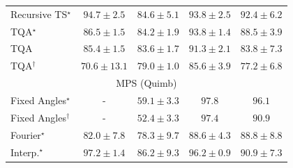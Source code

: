\begin{tabular}{l|cccc|}
Recursive TS$^\star$ & {\cellcolor[HTML]{6E096A}} \color[HTML]{F1F1F1} $94.7\pm 2.5$ & {\cellcolor[HTML]{8A51A5}} \color[HTML]{F1F1F1} $84.6\pm 5.1$ & {\cellcolor[HTML]{760C71}} \color[HTML]{F1F1F1} $93.8\pm 2.5$ & {\cellcolor[HTML]{81117D}} \color[HTML]{F1F1F1} $92.4\pm 6.2$ \\
TQA$^\star$ & {\cellcolor[HTML]{88449E}} \color[HTML]{F1F1F1} $86.5\pm 1.5$ & {\cellcolor[HTML]{8A55A7}} \color[HTML]{F1F1F1} $84.2\pm 1.9$ & {\cellcolor[HTML]{760C71}} \color[HTML]{F1F1F1} $93.8\pm 1.4$ & {\cellcolor[HTML]{863394}} \color[HTML]{F1F1F1} $88.5\pm 3.9$ \\
TQA & {\cellcolor[HTML]{894CA2}} \color[HTML]{F1F1F1} $85.4\pm 1.5$ & {\cellcolor[HTML]{8A59A8}} \color[HTML]{F1F1F1} $83.6\pm 1.7$ & {\cellcolor[HTML]{831A83}} \color[HTML]{F1F1F1} $91.3\pm 2.1$ & {\cellcolor[HTML]{8A58A8}} \color[HTML]{F1F1F1} $83.8\pm 7.3$ \\
TQA$^\dagger$ & {\cellcolor[HTML]{9BB6D7}} \color[HTML]{000000} $70.6\pm 13.1$ & {\cellcolor[HTML]{8C7AB8}} \color[HTML]{F1F1F1} $79.0\pm 1.0$ & {\cellcolor[HTML]{894BA2}} \color[HTML]{F1F1F1} $85.6\pm 3.9$ & {\cellcolor[HTML]{8C88BF}} \color[HTML]{F1F1F1} $77.2\pm 6.8$ \\
\cline{1-5}
\multicolumn{5}{c}{\rule{0pt}{8pt}MPS (Quimb)} \\
\midrule
Fixed Angles$^\star$ & {\cellcolor[HTML]{000000}} \color[HTML]{F1F1F1} {\cellcolor{white}} \color{black} - & {\cellcolor[HTML]{FFF4B5}} \color[HTML]{000000} $59.1\pm 3.3$ & {\cellcolor[HTML]{6B2606}} \color[HTML]{F1F1F1} $97.8$ & {\cellcolor[HTML]{792B05}} \color[HTML]{F1F1F1} $96.1$ \\
Fixed Angles$^\dagger$ & {\cellcolor[HTML]{000000}} \color[HTML]{F1F1F1} {\cellcolor{white}} \color{black} - & {\cellcolor[HTML]{FFFFE5}} \color[HTML]{000000} $52.4\pm 3.3$ & {\cellcolor[HTML]{6E2706}} \color[HTML]{F1F1F1} $97.4$ & {\cellcolor[HTML]{A83B03}} \color[HTML]{F1F1F1} $90.9$ \\
Fourier$^\star$ & {\cellcolor[HTML]{E76B11}} \color[HTML]{F1F1F1} $82.0\pm 7.8$ & {\cellcolor[HTML]{F5841E}} \color[HTML]{F1F1F1} $78.3\pm 9.7$ & {\cellcolor[HTML]{BC4503}} \color[HTML]{F1F1F1} $88.6\pm 4.3$ & {\cellcolor[HTML]{BB4403}} \color[HTML]{F1F1F1} $88.8\pm 8.8$ \\
Interp.$^\star$ & {\cellcolor[HTML]{702806}} \color[HTML]{F1F1F1} $97.2\pm 1.4$ & {\cellcolor[HTML]{CF5004}} \color[HTML]{F1F1F1} $86.2\pm 9.3$ & {\cellcolor[HTML]{792B05}} \color[HTML]{F1F1F1} $96.2\pm 0.9$ & {\cellcolor[HTML]{A83B03}} \color[HTML]{F1F1F1} $90.9\pm 7.3$ \\

\end{tabular}

